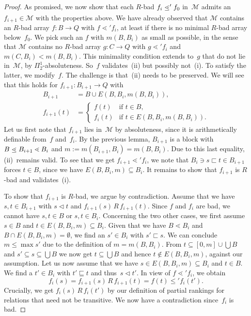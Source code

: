 \documentclass{amsart}
\numberwithin{theorem}{section}
\theoremstyle{definition}
\newcommand\ledot{\mathrel{\ensurestackMath{%
  \stackengine{-.5ex}{\lessdot}{-}{U}{c}{F}{F}{S}}}}
\newcommand{\extbarr}[3]{E(#1,#2,#3)}
\newcommand{\minbarr}[2]{m(#1,#2)}
\begin{document}
\begin{proof}
As promised, we now show that each $R$-bad $f_i\ledot' f_0$ in~$\mathcal M$ admits an \mbox{$f_{i+1}\in\mathcal M$} with the properties above. We have already observed that $\mathcal M$ contains an \mbox{$R$-bad} array $f:B\to Q$ with $f\lessdot' f_i$, at least if there is no minimal $R$-bad array below~$f_0$. We pick such an $f$ with $m(B,B_i)$ as small as possible, in the sense that $\mathcal M$ contains no $R$-bad array $g:C\to Q$ with $g\lessdot' f_i$ and $m(C,B_i)<m(B,B_i)$. This minimality condition extends to~$g$ that do not lie in~$\mathcal M$, by $\Pi^1_2$-absoluteness. So~$f$ validates~(ii) but possibly not~(i). To satisfy the latter, we modify~$f$. The challenge is that~(ii) needs to be preserved. We will see that this holds for $f_{i+1}:B_{i+1}\to Q$ with
\begin{align*}
  B_{i+1}&=B \cup \extbarr{B}{B_i}{\minbarr{B}{B_i}},\\
  f_{i+1}(t)&=
  \begin{cases}
    f(t) & \text{if } t\in B,\\
    f_i(t) & \text{if } t\in \extbarr{B}{B_i}{\minbarr{B}{B_i}}.
  \end{cases}
\end{align*}
Let us first note that $f_{i+1}$ lies in~$\mathcal M$ by absoluteness, since it is arithmetically definable from~$f$ and~$f_i$. By the previous lemma, $B_{i+1}$ is a block with $B\ledot B_{i+1}\lessdot B_i$ and $m:=m(B_{i+1},B_i)=m(B,B_i)$. Due to this last equality, (ii)~remains valid. To see that we get $f_{i+1}\lessdot'f_i$, we note that $B_i\ni s\sqsubset t\in B_{i+1}$ forces $t\in B$, since we have $E(B,B_i,m)\subseteq B_i$. It remains to show that $f_{i+1}$ is $R$-bad and validates~(i).

To show that $f_{i+1}$ is $R$-bad, we argue by contradiction. Assume that we have $s,t\in B_{i+1}$ with $s\vartriangleleft t$ and $f_{i+1}(s)\,R\, f_{i+1}(t)$. Since $f$ and $f_i$ are bad, we cannot have $s,t\in B$ or $s,t\in B_i$. Concerning the two other cases, we first assume $s\in B$ and $t\in E(B,B_i,m)\subseteq B_i$. Given that we have $B\lessdot B_i$ and $B\cap E(B,B_i,m)=\emptyset$, we find an $s'\in B_i$ with $s'\sqsubset s$. We can conclude $m\leq \max s'$ due to the definition of $m=m(B,B_i)$. From $t\subseteq[0,m]\cup\bigcup B$ and $s'\subseteq s\subseteq\bigcup B$ we now get $t\subseteq\bigcup B$ and hence $t\notin E(B,B_i,m)$, against our assumption. Let us now assume that we have $s\in E(B,B_i,m)\subseteq B_i$ and $t\in B$. We find a $t'\in B_i$ with $t'\sqsubseteq t$ and thus~$s\vartriangleleft t'$. In view of $f\lessdot' f_i$, we obtain
\begin{equation*}
    f_i(s)=f_{i+1}(s)\,R\,f_{i+1}(t)=f(t)\leq' f_i(t').
\end{equation*}
Crucially, we get $f_i(s)\,R\, f_i(t')$ by our definition of partial rankings for relations that need not be transitive. We now have a contradiction since~$f_i$ is bad.


\end{proof}
\end{document}
